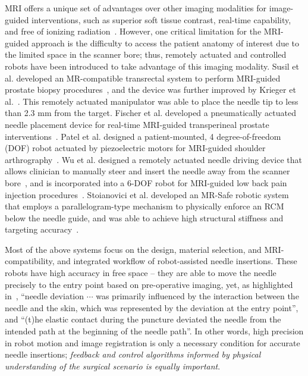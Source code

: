 MRI offers a unique set of advantages over other imaging modalities for image-guided interventions, such as superior soft tissue contrast, real-time capability, and free of ionizing radiation~\parencite{tsekosMagneticResonanceCompatible2007}. However, one critical limitation for the MRI-guided approach is the difficulty to access the patient anatomy of interest due to the limited space in the scanner bore; thus, remotely actuated and controlled robots have been introduced to take advantage of this imaging modality. Susil et al. developed an MR-compatible transrectal system to perform MRI-guided prostate biopsy procedures~\parencite{susilSystemMRImage2003, susilSystemProstateBrachytherapy2004}, and the device was further improved by Krieger et al.~\parencite{kriegerDesignNovelMRI2005}. This remotely actuated manipulator was able to place the needle tip to less than 2.3 mm from the target. Fischer et al. developed a pneumatically actuated needle placement device for real-time MRI-guided  transperineal prostate interventions~\parencite{fischerMRICompatiblePneumaticRobot2008}. Patel et al. designed a patient-mounted, 4 degree-of-freedom (DOF) robot actuated by piezoelectric motors for MRI-guided shoulder arthrography~\parencite{patelRoboticSystemMRIGuided2018}. Wu et al. designed a remotely actuated needle driving device that allows clinician to manually steer and insert the needle away from the scanner bore~\parencite{wuRemotelyActuatedNeedle2019}, and is incorporated into a 6-DOF robot for MRI-guided low back pain injection procedures~\parencite{liFullyActuatedBodyMounted2020a}. Stoianovici et al. developed an MR-Safe robotic system that employs a parallelogram-type mechanism to physically enforce an RCM below the needle guide, and was able to achieve high structural stiffness and targeting accuracy~\parencite{stoianoviciMultiImagerCompatibleMR2018}. 

Most of the above systems focus on the design, material selection, and MRI-compatibility, and integrated workflow of robot-assisted needle insertions. These robots have high accuracy in free space -- they are able to move the needle precisely to the entry point based on pre-operative imaging, yet, as highlighted in~\parencite{moreiraEvaluationRobotAssistedMRIGuided2018}, ``needle deviation $\cdots$ was primarily influenced by the interaction between the needle and the skin, which was represented by the deviation at the entry point'', and ``(t)he elastic contact during the puncture deviated the needle from the intended path at the beginning of the needle path''. In other words, high precision in robot motion and image registration is only a necessary condition for accurate needle insertions; \emph{feedback and control algorithms informed by physical understanding of the surgical scenario is equally important}.

